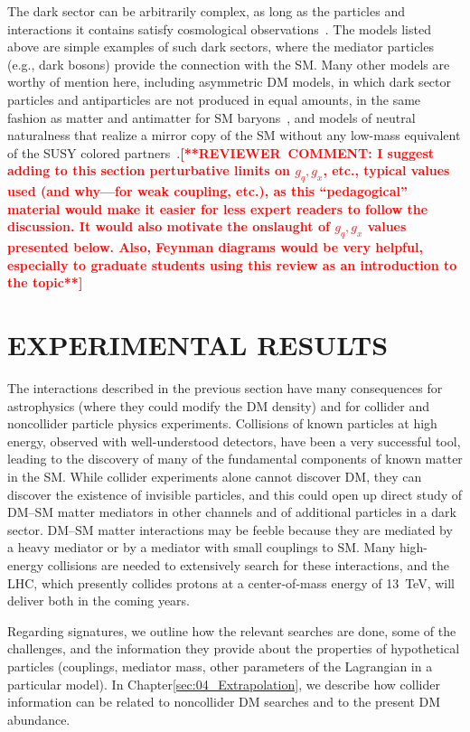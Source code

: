 \documentclass{ar-1col}
\newcommand{\IP}{invisible particle}
\begin{document}
The dark sector can be arbitrarily complex, as long as the
particles and interactions it contains satisfy cosmological
observations~\cite{Strassler:2006im, Evans:2017kti}. The models
listed above are simple examples of such dark sectors, where the
mediator particles (e.g., dark bosons) provide the connection with
the SM. Many other models are worthy of mention here, including
asymmetric DM models, in which dark sector particles and
antiparticles are not produced in equal amounts, in the same
fashion as matter and antimatter for SM
baryons~\cite{Zurek:2013wia}, and models of neutral
naturalness that realize a mirror copy of the SM without any
low-mass equivalent of the SUSY colored
partners~\cite{Craig:2014aea}.\textbf{\textcolor{red}{[**REVIEWER\ COMMENT: I suggest adding to this section perturbative limits on $g_q, g_x$, etc., typical values used (and why---for weak coupling, etc.), as this ``pedagogical'' material would make it easier for less expert readers to follow the discussion. It would also motivate the onslaught of $g_q, g_x$ values presented below. Also, Feynman diagrams would be very helpful, especially to graduate students using this review as an introduction to the topic**]}}

\section{EXPERIMENTAL RESULTS}\label{sec:03_ExperimentalResults}

The interactions described in the previous section have many
consequences for astrophysics (where they could modify the DM
density) and for collider and noncollider particle physics
experiments.
Collisions of known particles at high energy, observed with
well-understood detectors, have been a very successful tool,
leading to the discovery of many of the fundamental components of
known matter in the SM. While collider experiments alone cannot
discover DM, they can discover {the existence of \IP}s, and this could open up
direct study of DM--SM matter mediators in other channels and of
additional particles in a dark sector. DM--SM matter interactions may be
feeble because they are mediated by a heavy mediator or by a
mediator with small couplings to SM. Many high-energy collisions are needed to extensively search for these interactions, and the
LHC, which presently collides protons at a center-of-mass energy
of 13~TeV, will deliver both in the coming years.

Regarding signatures, we outline how the relevant searches are done, some
of the challenges, and the information they provide about the properties
of hypothetical particles (couplings, mediator mass, other
parameters of the Lagrangian in a particular model). In Chapter\ref{sec:04_Extrapolation}, 
we describe how collider information can be related to
noncollider DM searches and to the present DM abundance.
\end{document}
